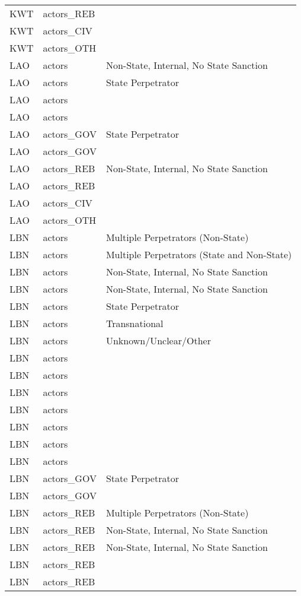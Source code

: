 \begin{table}[ht]
\begin{tabular}{lll}
  KWT & actors\_REB &  \\ 
  KWT & actors\_CIV &  \\ 
  KWT & actors\_OTH &  \\ 
  LAO & actors & Non-State, Internal, No State Sanction \\ 
  LAO & actors & State Perpetrator \\ 
  LAO & actors &  \\ 
  LAO & actors &  \\ 
  LAO & actors\_GOV & State Perpetrator \\ 
  LAO & actors\_GOV &  \\ 
  LAO & actors\_REB & Non-State, Internal, No State Sanction \\ 
  LAO & actors\_REB &  \\ 
  LAO & actors\_CIV &  \\ 
  LAO & actors\_OTH &  \\ 
  LBN & actors & Multiple Perpetrators (Non-State) \\ 
  LBN & actors & Multiple Perpetrators (State and Non-State) \\ 
  LBN & actors & Non-State, Internal, No State Sanction \\ 
  LBN & actors & Non-State, Internal, No State Sanction \\ 
  LBN & actors & State Perpetrator \\ 
  LBN & actors & Transnational \\ 
  LBN & actors & Unknown/Unclear/Other \\ 
  LBN & actors &  \\ 
  LBN & actors &  \\ 
  LBN & actors &  \\ 
  LBN & actors &  \\ 
  LBN & actors &  \\ 
  LBN & actors &  \\ 
  LBN & actors &  \\ 
  LBN & actors\_GOV & State Perpetrator \\ 
  LBN & actors\_GOV &  \\ 
  LBN & actors\_REB & Multiple Perpetrators (Non-State) \\ 
  LBN & actors\_REB & Non-State, Internal, No State Sanction \\ 
  LBN & actors\_REB & Non-State, Internal, No State Sanction \\ 
  LBN & actors\_REB &  \\ 
  LBN & actors\_REB &  \\ 

\end{tabular}
\end{table}
